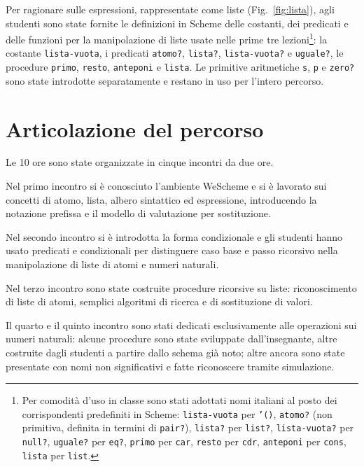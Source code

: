 \documentclass[withtimes]{easychair}
\begin{document}
Per ragionare sulle espressioni, rappresentate come liste (Fig.~\ref{fig:lista}), agli studenti sono state fornite le definizioni in Scheme delle costanti, dei predicati e delle funzioni per la manipolazione di liste usate nelle prime tre lezioni\footnote{Per comodità d'uso in classe sono stati adottati nomi italiani al posto dei corrispondenti predefiniti in Scheme: \texttt{lista-vuota} per \texttt{'()}, \texttt{atomo?} (non primitiva, definita in termini di \texttt{pair?}), \texttt{lista?} per \texttt{list?}, \texttt{lista-vuota?} per \texttt{null?}, \texttt{uguale?} per \texttt{eq?}, \texttt{primo} per \texttt{car}, \texttt{resto} per \texttt{cdr}, \texttt{anteponi} per \texttt{cons}, \texttt{lista} per \texttt{list}.}: la costante \texttt{lista-vuota}, i predicati \texttt{atomo?}, \texttt{lista?}, \texttt{lista-vuota?} e \texttt{uguale?}, le procedure \texttt{primo}, \texttt{resto}, \texttt{anteponi} e \texttt{lista}. Le primitive aritmetiche \texttt{s}, \texttt{p} e \texttt{zero?} sono state introdotte separatamente e restano in uso per l'intero percorso.

\section{Articolazione del percorso}\label{il-percorso-didattico}

Le 10 ore sono state organizzate in cinque incontri da due ore.

Nel primo incontro si è conosciuto l'ambiente WeScheme e si è lavorato sui concetti di atomo, lista, albero sintattico ed espressione, introducendo la notazione prefissa e il modello di valutazione per sostituzione.

Nel secondo incontro si è introdotta la forma condizionale e gli studenti hanno usato predicati e condizionali per distinguere caso base e passo ricorsivo nella manipolazione di liste di atomi e numeri naturali.

Nel terzo incontro sono state costruite procedure ricorsive su liste: riconoscimento di liste di atomi, semplici algoritmi di ricerca e di sostituzione di valori.

Il quarto e il quinto incontro sono stati dedicati esclusivamente alle operazioni sui numeri naturali: alcune procedure sono state sviluppate dall'insegnante, altre costruite dagli studenti a partire dallo schema già noto; altre ancora sono state presentate con nomi non significativi e fatte riconoscere tramite simulazione.
\end{document}
